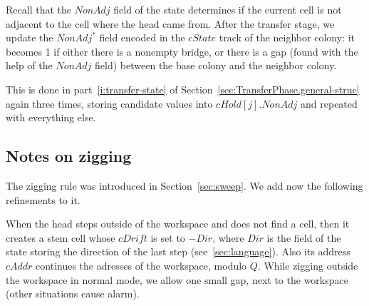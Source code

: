 \documentclass[12pt]{memoir}
\newcommand{\fld}[1]{\ensuremath{\textit{#1}}}
\newcommand{\Addr}{\fld{Addr}}
\newcommand{\cAddr}{\fld{cAddr}}
\newcommand{\Dir}{\fld{Dir}}
\newcommand{\cDrift}{\fld{cDrift}}
\newcommand{\NonAdj}{\fld{NonAdj}}
\newcommand{\cHold}{\fld{cHold}}
\newcommand{\Kind}{\fld{Kind}}
\newcommand{\cKind}{\fld{cKind}}
\newcommand{\cState}{\fld{cState}}
\newcommand{\Sweep}{\fld{Sw}}
\newcommand{\Member}{\mathrm{Member}}
\newcommand{\Target}{\mathrm{Target}}
\begin{document}





Recall that the \( \NonAdj \) field of the state determines
if the current cell is not adjacent to the cell  where the head came from.
After the transfer stage, we update the \( \NonAdj^{*} \) field encoded in the
\( \cState \) track of the neighbor colony: it becomes 1 if either there is a nonempty bridge,
or there is a gap (found with the help of the \( \NonAdj \) field) between the base colony
and the neighbor colony.

This is done in part~\ref{i:transfer-state} 
of Section~\ref{sec:TransferPhase.general-struc}
again three times, storing candidate values into \( \cHold[j].\NonAdj \)
and repeated with everything else.

 \subsection{Notes on zigging}\label{sec:zigging}

The zigging rule was introduced in Section~\ref{sec:sweep}.
We add now the following refinements to it.

When the head steps outside of the workspace and
does not find a cell, then it creates a stem cell whose
\( \cDrift \) is set to \( -\Dir \), where \( \Dir \) is the field
of the state storing the direction of the last step (see~\ref{sec:language}).
Also its address \( \cAddr \) continues the adresses of the workspace, 
modulo \( Q \).
While zigging outside the workspace in normal mode,
we allow one small gap, next to the workspace (other situations cause alarm).
\end{document}
